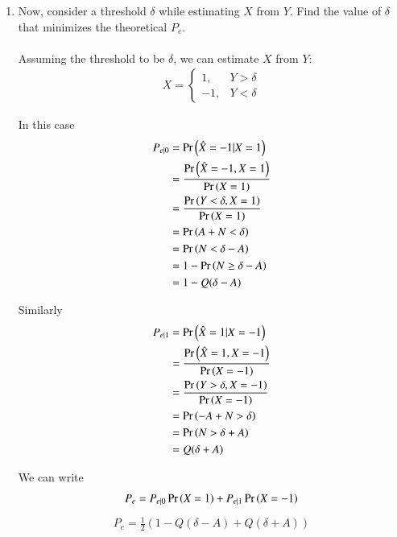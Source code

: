 \documentclass[journal,12pt,twocolumn]{IEEEtran}
\renewcommand\thesection{\arabic{section}}
\begin{document}
\begin{enumerate}[label=\thesection.\arabic*
,ref=\thesection.\theenumi]
	
\item Now, consider a threshold $\delta$ while estimating $X$ from $Y$. Find the value of $\delta$ that minimizes the theoretical $P_e$.
	\\
	\solution
	\\
	Assuming the threshold to be $\delta$, we can estimate $X$ from $Y$:
	\begin{align}
		X =
		\begin{cases}
			1, & Y > \delta \\
			-1, & Y < \delta
		\end{cases}
	\end{align}
	
	In this case
	\begin{align}
		P_{e|0} &= \Pr\left(\hat{X} = -1|X = 1\right) \\
		&= \frac{\Pr\left(\hat{X} = -1, X = 1\right)}{\Pr\left(X = 1\right)} \\
		&= \frac{\Pr\left(Y < \delta, X = 1\right)}{\Pr\left(X = 1\right)} \\
		&= \Pr\left(A + N < \delta\right) \\
		&= \Pr\left(N < \delta - A\right) \\
		&= 1 - \Pr\left(N \geq \delta - A\right)\\
		&= 1 - Q(\delta - A)
		\label{eq:PE0Delta}
	\end{align}
	
	Similarly
	\begin{align}
		P_{e|1} &= \Pr\left(\hat{X} = 1|X = -1\right) \\
		&= \frac{\Pr\left(\hat{X} = 1, X = -1\right)}{\Pr\left(X = -1\right)} \\
		&= \frac{\Pr\left(Y > \delta, X = -1\right)}{\Pr\left(X = -1\right)} \\
		&= \Pr\left(-A + N > \delta\right) \\
		&= \Pr\left(N > \delta + A\right) \\
		&= Q(\delta + A)
		\label{eq:PE1Delta}
	\end{align}
	
	We can write
	\begin{align}
		P_e = P_{e|0} \Pr\left(X = 1\right) + P_{e|1} \Pr\left(X = -1\right)
		\label{eq:PEDelta}
	\end{align}
	\begin{align}
		P_e = \frac{1}{2}\left( 1 - Q(\delta - A) + Q(\delta + A) \right)
	\end{align}
	

\end{enumerate}
\end{document}
